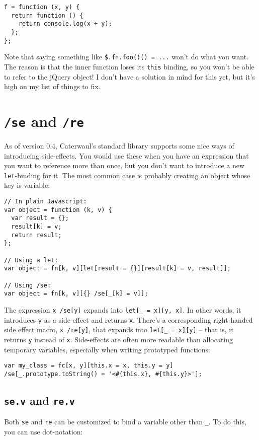 \documentclass{report}
\begin{document}
\begin{verbatim}
f = function (x, y) {
  return function () {
    return console.log(x + y);
  };
};
\end{verbatim}

      Note that saying something like \verb|$.fn.foo()() = ...| won't do what you want. The reason is that the inner function loses its {\tt this} binding, so you won't be able to refer to the
      jQuery object! I don't have a solution in mind for this yet, but it's high on my list of things to fix.

\section{{\tt /se} and {\tt /re}}\label{sec:the-std-library-se-and-re}
    As of version 0.4, Caterwaul's standard library supports some nice ways of introducing side-effects. You would use these when you have an expression that you want to reference more than
    once, but you don't want to introduce a new {\tt let}-binding for it. The most common case is probably creating an object whose key is variable:

\begin{verbatim}
// In plain Javascript:
var object = function (k, v) {
  var result = {};
  result[k] = v;
  return result;
};

// Using a let:
var object = fn[k, v][let[result = {}][result[k] = v, result]];

// Using /se:
var object = fn[k, v][{} /se[_[k] = v]];
\end{verbatim}

    The expression {\tt x /se[y]} expands into \verb|let[_ = x][y, x]|. In other words, it introduces {\tt y} as a side-effect and returns {\tt x}. There's a corresponding right-handed side
    effect macro, {\tt x /re[y]}, that expands into \verb|let[_ = x][y]| -- that is, it returns {\tt y} instead of {\tt x}. Side-effects are often more readable than allocating temporary
    variables, especially when writing prototyped functions:

\begin{verbatim}
var my_class = fc[x, y][this.x = x, this.y = y]
/se[_.prototype.toString() = '<#{this.x}, #{this.y}>'];
\end{verbatim}

\subsection{{\tt se.v} and {\tt re.v}}\label{sec:the-std-library-sev-and-rev}
      Both {\tt se} and {\tt re} can be customized to bind a variable other than \verb|_|. To do this, you can use dot-notation:
\end{document}
